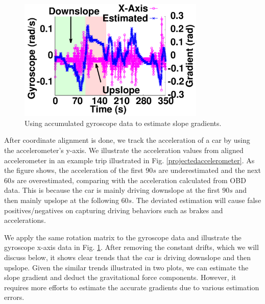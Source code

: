 \begin{figure}[!htbp]
\begin{center}
\includegraphics[width=3.5in,angle=0]{Figs/SlopeAware/gyrocompare.pdf}
\vspace{0.0cm}
\caption{Using accumulated gyroscope data to estimate slope gradients.}
\label{projectedgyroscope}
\vspace{-0.3cm}
\end{center}
\end{figure}



After coordinate alignment is done, 
we track the acceleration of a car by using the accelerometer's y-axis. 
We illustrate the acceleration values from aligned accelerometer 
in an example trip illustrated in Fig. \ref{projectedaccelerometer}. 
As the figure shows, 
the acceleration of the first $90s$ are underestimated and the next $60s$ are overestimated,
comparing with the acceleration calculated from OBD data.  
This is because the car is mainly driving downslope at 
the first $90s$ and then mainly upslope at the following $60s$. 
The deviated estimation will cause false positives/negatives on 
capturing driving behaviors such as brakes and accelerations.


We apply the same rotation matrix to the gyroscope data and 
illustrate the gyroscope x-axis data in Fig. \ref{projectedgyroscope}.
After removing the constant drifts, which we will discuss below, 
it shows clear trends that the car is driving downslope and then
upslope.
Given the similar trends illustrated in two plots, 
we can estimate the slope gradient and deduct the gravitational force
components. 
However, it requires more efforts to estimate the accurate
gradients due to various estimation errors.


